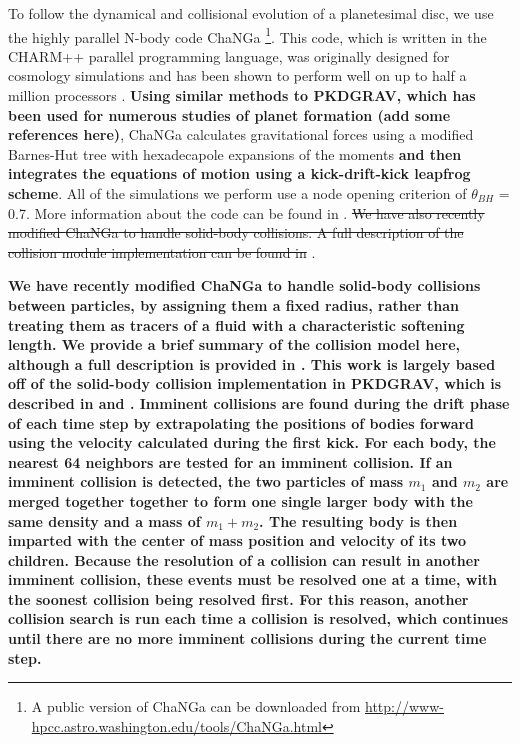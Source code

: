 \documentclass[fleqn,usenatbib]{mnras}
\begin{document}
To follow the dynamical and collisional evolution of a planetesimal disc, we use the highly parallel N-body code {\sc ChaNGa} 
\footnote{A public version of {\sc ChaNGa} can be downloaded from \url{http://www-hpcc.astro.washington.edu/tools/ChaNGa.html}}. 
This code, which is written in the {\sc CHARM++} parallel programming language, was originally designed for cosmology simulations 
and has been shown to perform well on up to half a million processors \citep{2015AphCom..2..1}. \textbf{Using similar methods to {\sc PKDGRAV}, which has been used for numerous studies of planet formation (add some references here)}, {\sc ChaNGa} calculates 
gravitational forces using a modified Barnes-Hut \citep{1986Natur.324..446B} tree with hexadecapole expansions of the moments \textbf{and then integrates the equations of motion using a kick-drift-kick leapfrog scheme}. 
All of the simulations we perform use a node opening criterion of $\theta_{BH}$ = 0.7. More information about the code can be found 
in \citet{2008IEEEpds...ChaNGa}. \sout{We have also recently modified {\sc ChaNGa} to handle solid-body collisions. A full description of 
the collision module implementation can be found in }\citet{2019MNRAS.489.2159W}.

\textbf{We have recently modified {\sc ChaNGa} to handle solid-body collisions between particles, by assigning them a fixed radius, rather than treating them as tracers of a fluid with a characteristic softening length. We provide a brief summary of the collision model here, although a full description is provided in \citet{2019MNRAS.489.2159W}. This work is largely based off of the solid-body collision implementation in {\sc PKDGRAV}, which is described in \citet{1994MNRAS.269..493R} and \citet{2000Icar..143...45R}. Imminent collisions are found during the drift phase of each time step by extrapolating the positions of bodies forward using the velocity calculated during the first kick. For each body, the nearest 64 neighbors are tested for an imminent collision. If an imminent collision is detected, the two particles of mass $m_{1}$ and $m_{2}$ are merged together together to form one single larger body with the same density and a mass of $m_{1} + m_{2}$. The resulting body is then imparted with the center of mass position and velocity of its two children. Because the resolution of a collision can result in another imminent collision, these events must be resolved one at a time, with the soonest collision being resolved first. For this reason, another collision search is run each time a collision is resolved, which continues until there are no more imminent collisions during the current time step.}
\end{document}
